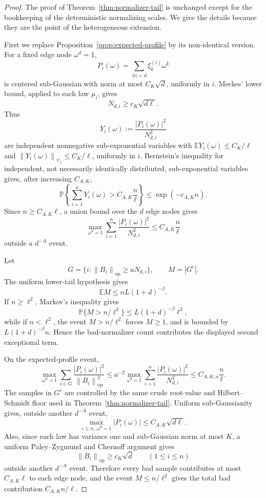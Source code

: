 \documentclass[11pt]{amsart}
\numberwithin{equation}{section}
\theoremstyle{definition}
\theoremstyle{remark}
\newcommand{\op}{\mathrm{op}}
\newcommand{\Prob}{\mathbb P}
\newcommand{\Exp}{\mathbb E}
\newcommand{\norm}[1]{\left\lVert #1\right\rVert}
\newcommand{\abs}[1]{\left\lvert #1\right\rvert}
\begin{document}
\begin{proof}
The proof of Theorem~\ref{thm:normalizer-tail} is unchanged except for the
bookkeeping of the deterministic normalizing scales.  We give the details
because they are the point of the heterogeneous extension.

First we replace Proposition~\ref{prop:expected-profile} by its non-identical
version.  For a fixed edge node \(\omega^d=1\),
\[
  P_i(\omega)=\sum_{\abs k<d}\xi_k^{(i)}\omega^k
\]
is centered sub-Gaussian with norm at most \(C_K\sqrt d\), uniformly in \(i\).
Meckes' lower bound, applied to each law \(\mu_i\), gives
\[
  N_{d,i}\ge c_K\sqrt{d\ell}.
\]
Thus
\[
  Y_i(\omega):=\frac{\abs{P_i(\omega)}^2}{N_{d,i}^2}
\]
are independent nonnegative sub-exponential variables with
\(\Exp Y_i(\omega)\le C_K/\ell\) and
\(\norm{Y_i(\omega)}_{\psi_1}\le C_K/\ell\), uniformly in \(i\).  Bernstein's
inequality for independent, not necessarily identically distributed,
sub-exponential variables gives, after increasing \(C_{A,K}\),
\[
  \Prob\left\{
    \sum_{i=1}^nY_i(\omega)>C_{A,K}\frac n\ell
  \right\}\le \exp(-c_{A,K}n).
\]
Since \(n\ge C_{A,K}\ell\), a union bound over the \(d\) edge nodes gives
\[
  \max_{\omega^d=1}\sum_{i=1}^n
  \frac{\abs{P_i(\omega)}^2}{N_{d,i}^2}
  \le C_{A,K}\frac n\ell
\]
outside a \(d^{-A}\) event.

Let
\[
  G=\{i:\norm{B_i}_{\op}\ge aN_{d,i}\},\qquad M=\abs{G^c}.
\]
The uniform lower-tail hypothesis gives
\[
  \Exp M\le nL(1+d)^{-\beta}.
\]
If \(n\ge\ell^2\), Markov's inequality gives
\[
  \Prob\{M>n/\ell^2\}\le L(1+d)^{-\beta}\ell^2,
\]
while if \(n<\ell^2\), the event \(M>n/\ell^2\) forces \(M\ge1\), and is bounded
by \(L(1+d)^{-\beta}n\).  Hence the bad-normalizer count contributes the
displayed second exceptional term.

On the expected-profile event,
\[
  \max_{\omega^d=1}\sum_{i\in G}
  \frac{\abs{P_i(\omega)}^2}{\norm{B_i}_{\op}^2}
  \le
  a^{-2}
  \max_{\omega^d=1}\sum_{i=1}^n
  \frac{\abs{P_i(\omega)}^2}{N_{d,i}^2}
  \le C_{A,K,a}\frac n\ell .
\]
The samples in \(G^c\) are controlled by the same crude root-value and
Hilbert--Schmidt floor used in Theorem~\ref{thm:normalizer-tail}.  Uniform
sub-Gaussianity gives, outside another \(d^{-A}\) event,
\[
  \max_{i\le n,\ \omega^d=1}\abs{P_i(\omega)}
  \le C_{A,K}\sqrt{d\ell}.
\]
Also, since each law has variance one and sub-Gaussian norm at most \(K\), a
uniform Paley--Zygmund and Chernoff argument gives
\[
  \norm{B_i}_{\op}\ge c_K\sqrt d
  \qquad(1\le i\le n)
\]
outside another \(d^{-A}\) event.  Therefore every bad sample contributes at
most \(C_{A,K}\ell\) to each edge node, and the event \(M\le n/\ell^2\) gives
the total bad contribution \(C_{A,K}n/\ell\).


\end{proof}
\end{document}
